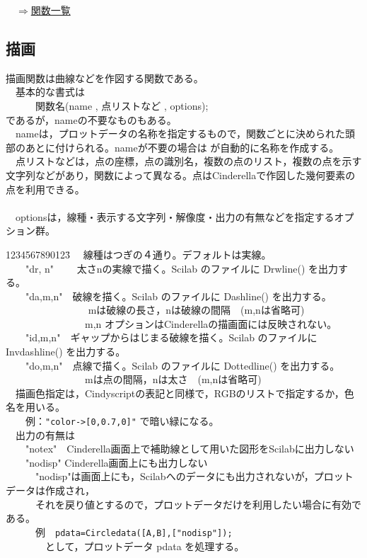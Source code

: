 \documentclass[papersize,a4paper,12pt,uplatex]{jsarticle}
\begin{document}
\begin{flushright}　\hyperlink{functionlist}{$\Rightarrow$関数一覧}\end{flushright}
\newpage
\subsection{描画}

描画関数は曲線などを作図する関数である。\\
　基本的な書式は\\
　　　関数名(name , 点リストなど , options);\\
であるが，nameの不要なものもある。\\
　nameは，プロットデータの名称を指定するもので，関数ごとに決められた頭部のあとに付けられる。nameが不要の場合は \ketcindy が自動的に名称を作成する。\\
　点リストなどは，点の座標，点の識別名，複数の点のリスト，複数の点を示す文字列などがあり，関数によって異なる。点はCinderellaで作図した幾何要素の点を利用できる。\\
　\\
　optionsは，線種・表示する文字列・解像度・出力の有無などを指定するオプション群。
\begin{tabbing}
1234567890123\=\kill
　線種はつぎの４通り。デフォルトは実線。\\
　　"dr, n"　　 \>太さnの実線で描く。Scilab のファイルに Drwline() を出力する。\\
　　"da,m,n"　\>破線を描く。Scilab のファイルに Dashline() を出力する。\\
　　　　　　　　\> mは破線の長さ，nは破線の間隔　(m,nは省略可)\\
　　　　　　　　\>m,n オプションはCinderellaの描画面には反映されない。\\
　　"id,m,n"　\>ギャップからはじまる破線を描く。Scilab のファイルに Invdashline() を出力する。\\
　　"do,m,n"　\>点線で描く。Scilab のファイルに Dottedline() を出力する。\\
　　　　　　　　\>mは点の間隔，nは太さ　(m,nは省略可)\\
　描画色指定は，Cindyscriptの表記と同様で，RGBのリストで指定するか，色名を用いる。\\
　　例：\verb|"color->[0,0.7,0]"| で暗い緑になる。\\
　出力の有無は\\
　　"notex"　\>Cinderella画面上で補助線として用いた図形をScilabに出力しない\\
　　"nodisp" \>Cinderella画面上にも出力しない\\

　　　"nodisp"は画面上にも，Scilabへのデータにも出力されないが，プロットデータは作成され，\\
　　　それを戻り値とするので，プロットデータだけを利用したい場合に有効である。\\
　　　例　\verb|pdata=Circledata([A,B],["nodisp"]);|\\
　　　　として，プロットデータ pdata を処理する。\\
\end{tabbing}
\end{document}
